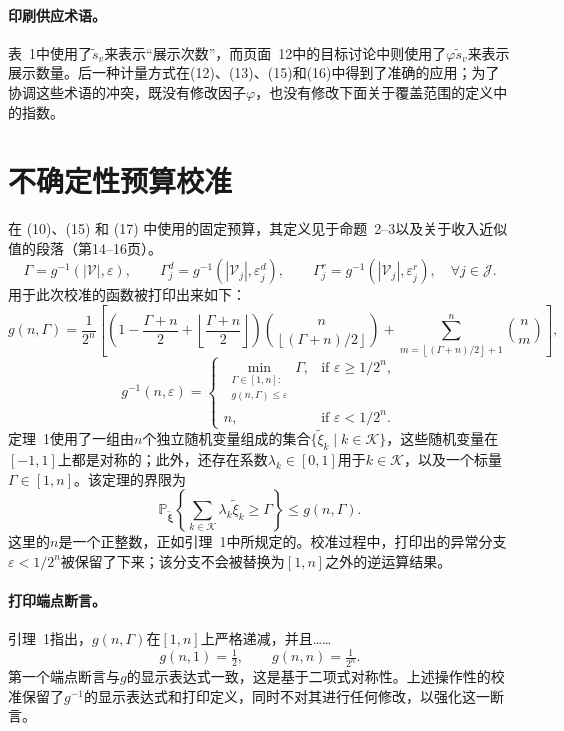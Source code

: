 \documentclass{article}
\begin{document}
\paragraph{印刷供应术语。}
表~1中使用了$\tilde s_v$来表示“展示次数”，而页面~12中的目标讨论中则使用了$\varphi\tilde s_v$来表示展示数量。后一种计量方式在(12)、(13)、(15)和(16)中得到了准确的应用；为了协调这些术语的冲突，既没有修改因子$\varphi$，也没有修改下面关于覆盖范围的定义中的指数。

\section*{不确定性预算校准}
在 (10)、(15) 和 (17) 中使用的固定预算，其定义见于命题~2--3以及关于收入近似值的段落（第14--16页）。
\[
\Gamma=g^{-1}(|\mathcal V|,\varepsilon),\qquad
\Gamma^d_j=g^{-1}(|\mathcal V_j|,\varepsilon^d_j),\qquad
\Gamma^r_j=g^{-1}(|\mathcal V_j|,\varepsilon^r_j),\quad\forall j\in\mathcal J.
\]
用于此次校准的函数被打印出来如下：
\[
g(n,\Gamma)=\frac{1}{2^n}\left[
\left(1-\frac{\Gamma+n}{2}+\left\lfloor\frac{\Gamma+n}{2}\right\rfloor\right)
\binom{n}{\left\lfloor(\Gamma+n)/2\right\rfloor}
+\sum_{m=\left\lfloor(\Gamma+n)/2\right\rfloor+1}^{n}\binom{n}{m}
\right],
\]
\[
g^{-1}(n,\varepsilon)=
\begin{cases}
\displaystyle\min_{\substack{\Gamma\in[1,n]:\\g(n,\Gamma)\leq\varepsilon}}\Gamma,
&\text{if }\varepsilon\geq1/2^n,\\[2mm]
n,&\text{if }\varepsilon<1/2^n.
\end{cases}
\]
定理~1使用了一组由$n$个独立随机变量组成的集合$\{\tilde\xi_k\mid k\in\mathcal K\}$，这些随机变量在$[-1,1]$上都是对称的；此外，还存在系数$\lambda_k\in[0,1]$用于$k\in\mathcal K$，以及一个标量$\Gamma\in[1,n]$。该定理的界限为
\[
\mathbb P_{\tilde{\boldsymbol\xi}}\left\{\sum_{k\in\mathcal K}\lambda_k\tilde\xi_k\geq\Gamma\right\}\leq g(n,\Gamma).
\]
这里的$n$是一个正整数，正如引理~1中所规定的。校准过程中，打印出的异常分支$\varepsilon<1/2^n$被保留了下来；该分支不会被替换为$[1,n]$之外的逆运算结果。

\paragraph{打印端点断言。}
引理~1指出，$g(n,\Gamma)$在$[1,n]$上严格递减，并且……
\[
g(n,1)=\tfrac12,\qquad g(n,n)=\tfrac{1}{2^n}.
\]
第一个端点断言与$g$的显示表达式一致，这是基于二项式对称性。上述操作性的校准保留了$g^{-1}$的显示表达式和打印定义，同时不对其进行任何修改，以强化这一断言。
\end{document}
